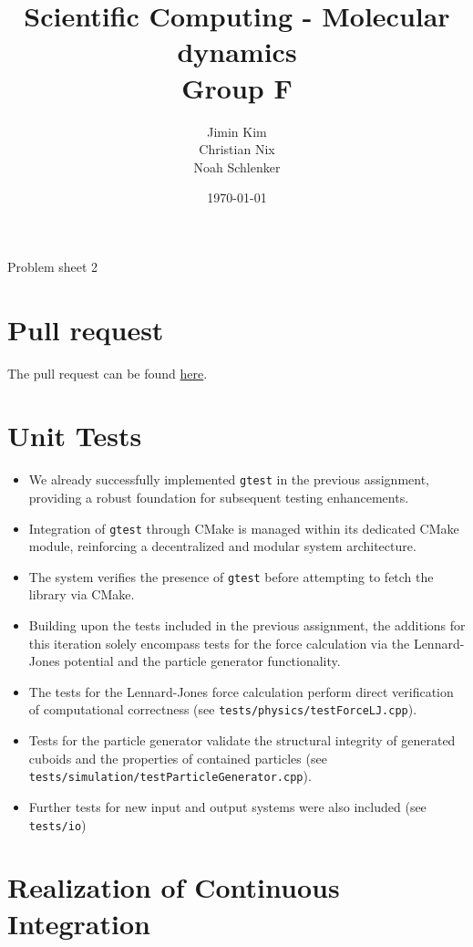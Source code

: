\documentclass{article}
\title{Scientific Computing - Molecular dynamics \\ Group F}
\author{
    Jimin Kim \\
    Christian Nix \\
    Noah Schlenker
}
\date{\today}
\newcommand{\subtitle}{Problem sheet 2}
\begin{document}
\maketitle

\begin{center}
    \LARGE \subtitle{}
\end{center}

\section{Pull request}
\label{sec:pr}
The pull request can be found \href{https://github.com/noahpy/MolSim-SS24/pull/10}{here}.

\section{Unit Tests}
\label{sec:ut}

\begin{itemize}
    \item We already successfully implemented \verb|gtest| in the previous assignment, providing a robust foundation for subsequent testing enhancements.
    \item Integration of \verb|gtest| through CMake is managed within its dedicated CMake module, reinforcing a decentralized and modular system architecture.
    \item The system verifies the presence of \verb|gtest| before attempting to fetch the library via CMake.
    \item Building upon the tests included in the previous assignment, the additions for this iteration solely encompass tests for the force calculation via the Lennard-Jones potential and the particle generator functionality.
    \item The tests for the Lennard-Jones force calculation perform direct verification of computational correctness (see \texttt{tests/physics/testForceLJ.cpp}).
    \item Tests for the particle generator validate the structural integrity of generated cuboids and the properties of contained particles \newline(see \texttt{tests/simulation/testParticleGenerator.cpp}).
    \item Further tests for new input and output systems were also included (see \texttt{tests/io})
\end{itemize}

\section{Realization of Continuous Integration}
\label{sec:ci}
\end{document}
